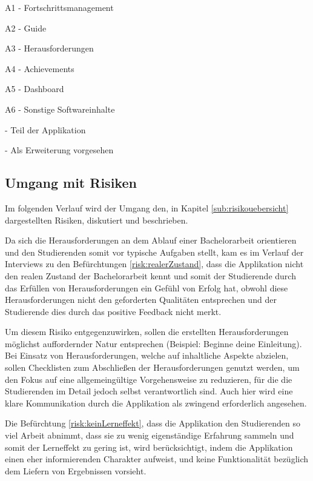 \documentclass[bibliography=totoc,listof=totoc,BCOR=5mm,DIV=12,oneside]{scrbook}
\begin{document}
\begin{tablenotes}
\item  A1 - Fortschrittsmanagement
\item  A2 - Guide
\item  A3 - Herausforderungen
\item  A4 - Achievements
\item  A5 - Dashboard
\item  A6 - Sonstige Softwareinhalte
\item {} - Teil der Applikation
\item {} - Als Erweiterung vorgesehen
\end{tablenotes} 
\label{tab:abdeckungProduktfunktionen}

\newpage
\subsection{Umgang mit Risiken}
\par Im folgenden Verlauf wird der Umgang den, in Kapitel \ref{sub:risikouebersicht} dargestellten Risiken, diskutiert und beschrieben.
\par \medskip Da sich die Herausforderungen an dem Ablauf einer Bachelorarbeit orientieren und den Studierenden somit vor typische Aufgaben stellt, kam es im Verlauf der Interviews zu den Befürchtungen \ref{risk:realerZustand}, dass die Applikation nicht den realen Zustand der Bachelorarbeit kennt und somit der Studierende durch das Erfüllen von Herausforderungen ein Gefühl von Erfolg hat, obwohl diese Herausforderungen nicht den geforderten Qualitäten entsprechen und der Studierende dies durch das positive Feedback nicht merkt.
\par Um diesem Risiko entgegenzuwirken, sollen die erstellten Herausforderungen möglichst auffordernder Natur entsprechen (Beispiel: Beginne deine Einleitung). Bei Einsatz von Herausforderungen, welche auf inhaltliche Aspekte abzielen, sollen Checklisten zum Abschließen der Herausforderungen genutzt werden, um den Fokus auf eine allgemeingültige Vorgehensweise zu reduzieren, für die die Studierenden im Detail jedoch selbst verantwortlich sind. Auch hier wird eine klare Kommunikation durch die Applikation als zwingend erforderlich angesehen.

\par \medskip Die Befürchtung \ref{risk:keinLerneffekt}, dass die Applikation den Studierenden so viel Arbeit abnimmt, dass sie zu wenig eigenständige Erfahrung sammeln und somit der Lerneffekt zu gering ist, wird berücksichtigt, indem die Applikation einen eher informierenden Charakter aufweist, und keine Funktionalität bezüglich dem Liefern von Ergebnissen vorsieht.
\end{document}
